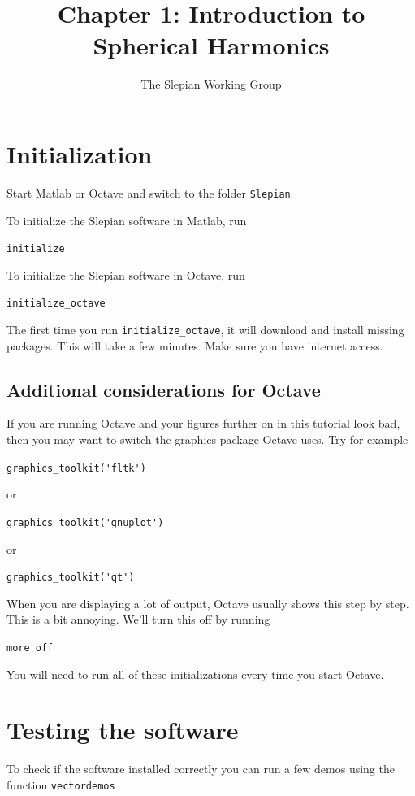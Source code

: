 \documentclass[11pt]{article}
\title{Chapter 1: Introduction to Spherical Harmonics}
\author{The Slepian Working Group}
\begin{document}
\maketitle

\section{Initialization}

Start Matlab or Octave and switch to the folder \verb+Slepian+

To initialize the Slepian software in Matlab, run

\qquad \verb+initialize+

To initialize the Slepian software in Octave, run

\qquad \verb+initialize_octave+

The first time you run \verb+initialize_octave+, it will download and install
missing packages. This will take a few minutes. Make sure you have
internet access. 

\subsection{Additional considerations for Octave}

If you are running Octave and your figures further on in this tutorial
look bad, then you may want to switch the graphics package Octave
uses. Try for example

\qquad \verb+graphics_toolkit('fltk')+

or

\qquad \verb+graphics_toolkit('gnuplot')+

or

\qquad \verb+graphics_toolkit('qt')+

When you are displaying a lot of output, Octave usually shows this
step by step. This is a bit annoying. We'll turn this off by running

\qquad \verb+more off+

You will need to run all of these initializations every time you start
Octave.



\section{Testing the software}\label{testing}
To check if the software installed correctly you can run a few demos
using the function \verb+vectordemos+
\end{document}
